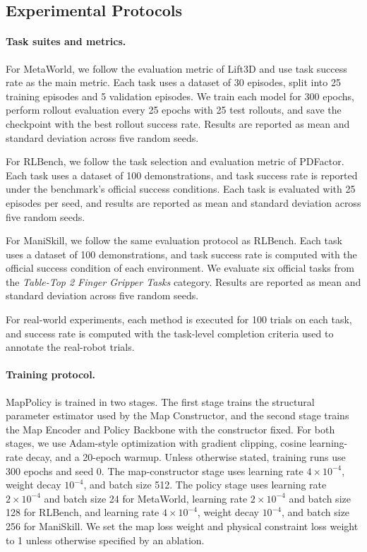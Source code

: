 \subsection{Experimental Protocols}
\label{app:experimental_protocols}

\paragraph{Task suites and metrics.}
For MetaWorld, we follow the evaluation metric of Lift3D and use task success rate as the main metric. Each task uses a dataset of 30 episodes, split into 25 training episodes and 5 validation episodes. We train each model for 300 epochs, perform rollout evaluation every 25 epochs with 25 test rollouts, and save the checkpoint with the best rollout success rate. Results are reported as mean and standard deviation across five random seeds.

For RLBench, we follow the task selection and evaluation metric of PDFactor. Each task uses a dataset of 100 demonstrations, and task success rate is reported under the benchmark's official success conditions. Each task is evaluated with 25 episodes per seed, and results are reported as mean and standard deviation across five random seeds.

For ManiSkill, we follow the same evaluation protocol as RLBench. Each task uses a dataset of 100 demonstrations, and task success rate is computed with the official success condition of each environment. We evaluate six official tasks from the \textit{Table-Top 2 Finger Gripper Tasks} category. Results are reported as mean and standard deviation across five random seeds.

For real-world experiments, each method is executed for 100 trials on each task, and success rate is computed with the task-level completion criteria used to annotate the real-robot trials.

\paragraph{Training protocol.}
MapPolicy is trained in two stages. The first stage trains the structural parameter estimator used by the Map Constructor, and the second stage trains the Map Encoder and Policy Backbone with the constructor fixed. For both stages, we use Adam-style optimization with gradient clipping, cosine learning-rate decay, and a 20-epoch warmup. Unless otherwise stated, training runs use 300 epochs and seed 0. The map-constructor stage uses learning rate $4\times10^{-4}$, weight decay $10^{-4}$, and batch size 512. The policy stage uses learning rate $2\times10^{-4}$ and batch size 24 for MetaWorld, learning rate $2\times10^{-4}$ and batch size 128 for RLBench, and learning rate $4\times10^{-4}$, weight decay $10^{-4}$, and batch size 256 for ManiSkill. We set the map loss weight and physical constraint loss weight to 1 unless otherwise specified by an ablation.

